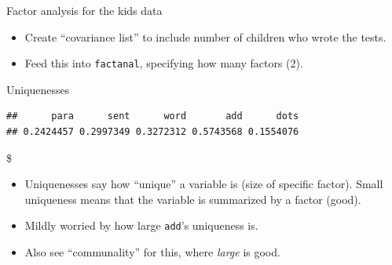 \documentclass[ignorenonframetext,]{beamer}
\newenvironment{Shaded}{\begin{snugshade}}{\end{snugshade}}
\newcommand{\DataTypeTok}[1]{\textcolor[rgb]{0.13,0.29,0.53}{#1}}
\newcommand{\DecValTok}[1]{\textcolor[rgb]{0.00,0.00,0.81}{#1}}
\newcommand{\KeywordTok}[1]{\textcolor[rgb]{0.13,0.29,0.53}{\textbf{#1}}}
\newcommand{\NormalTok}[1]{#1}
\newcommand{\OperatorTok}[1]{\textcolor[rgb]{0.81,0.36,0.00}{\textbf{#1}}}
\newcommand{\StringTok}[1]{\textcolor[rgb]{0.31,0.60,0.02}{#1}}
\begin{document}
\begin{frame}[fragile]{Factor analysis for the kids data}
\protect\hypertarget{factor-analysis-for-the-kids-data}{}

\begin{itemize}
\item
  Create ``covariance list'' to include number of children who wrote the
  tests.
\item
  Feed this into \texttt{factanal}, specifying how many factors (2).
\end{itemize}

\begin{Shaded}
\end{Shaded}

\end{frame}

\begin{frame}[fragile]{Uniquenesses}
\protect\hypertarget{uniquenesses}{}

\begin{Shaded}
\end{Shaded}

\begin{verbatim}
##      para      sent      word       add      dots 
## 0.2424457 0.2997349 0.3272312 0.5743568 0.1554076
\end{verbatim}

\$

\begin{itemize}
\item
  Uniquenesses say how ``unique'' a variable is (size of specific
  factor). Small uniqueness means that the variable is summarized by a
  factor (good).
\item
  Mildly worried by how large \texttt{add}'s uniqueness is.
\item
  Also see ``communality'' for this, where \emph{large} is good.
\end{itemize}

\end{frame}
\end{document}
